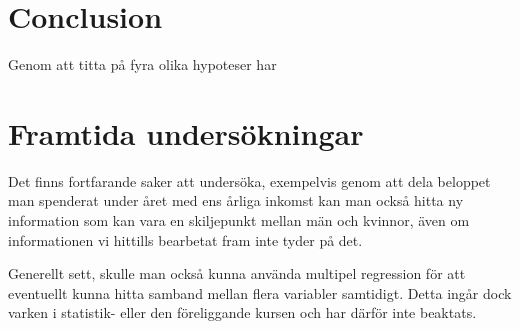 \documentclass[]{article}
\begin{document}
\section{Conclusion}

Genom att titta på fyra olika hypoteser har 



\section{Framtida undersökningar}

Det finns fortfarande saker att undersöka, exempelvis genom att dela beloppet man spenderat under året med ens årliga inkomst kan man också hitta ny information som kan vara en skiljepunkt mellan män och kvinnor, även om informationen vi hittills bearbetat fram inte tyder på det.

Generellt sett, skulle man också kunna använda multipel regression för att eventuellt kunna hitta samband mellan flera variabler samtidigt. Detta ingår dock varken i statistik- eller den föreliggande kursen och har därför inte beaktats.
\end{document}

